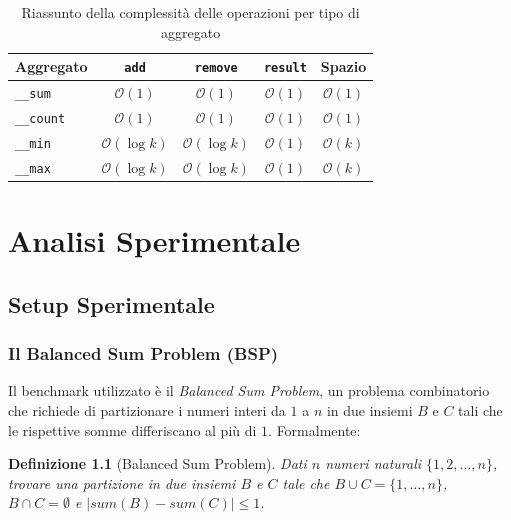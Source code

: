 \documentclass[a4paper,12pt,twoside,openright]{report}
\newtheorem{definition}{Definizione}[chapter]
\begin{document}
\begin{table}[H]
    \centering
    \caption{Riassunto della complessit\`{a} delle operazioni per tipo di aggregato}
    \label{tab:complessita}
    \begin{tabular}{lcccc}
        \toprule
        \textbf{Aggregato} & \texttt{add} & \texttt{remove} & \texttt{result} & \textbf{Spazio} \\
        \midrule
        \texttt{\_\_sum}   & $\mathcal{O}(1)$ & $\mathcal{O}(1)$ & $\mathcal{O}(1)$ & $\mathcal{O}(1)$ \\
        \texttt{\_\_count} & $\mathcal{O}(1)$ & $\mathcal{O}(1)$ & $\mathcal{O}(1)$ & $\mathcal{O}(1)$ \\
        \texttt{\_\_min}   & $\mathcal{O}(\log k)$ & $\mathcal{O}(\log k)$ & $\mathcal{O}(1)$ & $\mathcal{O}(k)$ \\
        \texttt{\_\_max}   & $\mathcal{O}(\log k)$ & $\mathcal{O}(\log k)$ & $\mathcal{O}(1)$ & $\mathcal{O}(k)$ \\
        \bottomrule
    \end{tabular}
\end{table}

\chapter{Analisi Sperimentale}
\label{ch:sperimentale}

\section{Setup Sperimentale}

\subsection{Il Balanced Sum Problem (BSP)}

Il benchmark utilizzato \`{e} il \emph{Balanced Sum Problem}, un problema combinatorio che richiede di partizionare i numeri interi da $1$ a $n$ in due insiemi $B$ e $C$ tali che le rispettive somme differiscano al pi\`{u} di $1$. Formalmente:

\begin{definition}[Balanced Sum Problem]
Dati $n$ numeri naturali $\{1, 2, \ldots, n\}$, trovare una partizione in due insiemi $B$ e $C$ tale che $B \cup C = \{1, \ldots, n\}$, $B \cap C = \emptyset$ e $|sum(B) - sum(C)| \leq 1$.
\end{definition}
\end{document}
